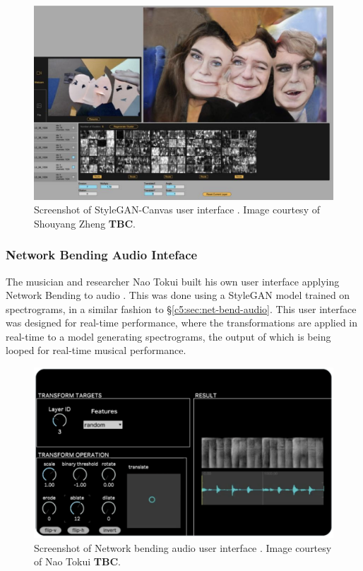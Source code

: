 \begin{figure}[!htb]
    \centering
    \captionsetup{justification=centering}
    \includegraphics[width=1\textwidth]{figures/c7_impact/net-bend-technical/stylegan-canvas.png}
    \caption[StyleGAN-Canvas user interface]{Screenshot of StyleGAN-Canvas user interface \citep{zheng2023stylegan}. Image courtesy of Shouyang Zheng \textbf{TBC}.}
    \label{fig:c7:stylegan-canvas}
\end{figure}

\subsubsection{Network Bending Audio Inteface}
\label{c7:subsubsec:naotokui}

The musician and researcher Nao Tokui built his own user interface applying Network Bending to audio \cite{tokui2023bending}. 
This was done using a StyleGAN model trained on spectrograms, in a similar fashion to \S \ref{c5:sec:net-bend-audio}.
This user interface was designed for real-time performance, where the transformations are applied in real-time to a model generating spectrograms, the output of which is being looped for real-time musical performance.

\begin{figure}[!htb]
    \centering
    \captionsetup{justification=centering}
    \includegraphics[width=1\textwidth]{figures/c7_impact/net-bend-technical/nao-tokui-stylegan-audio.png}
    \caption[Network bending audio user interface]{Screenshot of Network bending audio user interface \citep{tokui2023bending}. Image courtesy of Nao Tokui \textbf{TBC}.}
    \label{fig:c7:stylegan-canvas}
\end{figure}

